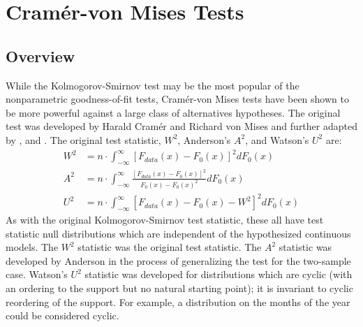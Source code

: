 
\section{Cram\'{e}r-von Mises Tests}

\subsection{Overview}


While the Kolmogorov-Smirnov test may be the most popular of
the nonparametric goodness-of-fit tests, Cram\'{e}r-von Mises
tests have been shown to be more powerful against a large class
of alternatives hypotheses. 
The original test was developed by
Harald Cram\'{e}r and Richard von Mises \citep{cramer1928, vonmises1928} and further adapted by \cite{anderson1952}, and  \cite{Watson1961}. 
The original test statistic, $W^2$, Anderson's $A^2$, and Watson's
$U^2$ are:
\begin{align}
W^2 &= n \cdot \int_{-\infty}^{\infty} \left[ F_{data}(x)- F_{0}(x) \right]^2 dF_0(x) \label{W2} \\
A^2 &= n \cdot \int_{-\infty}^{\infty} \frac{\left[F_{data}(x)- F_{0}(x) \right]^2}{F_0(x) -F_0(x)^2} dF_0(x) \label{A2} \\
U^2 &= n \cdot \int_{-\infty}^{\infty} \left[ F_{data}(x)- F_{0}(x) - W^2 \right]^2 dF_0(x) \label{U2}
\end{align}
As with the original Kolmogorov-Smirnov test statistic, these all have 
test statistic null distributions which are independent of the
hypothesized continuous models.
The $W^2$ statistic was the original test statistic.
The $A^2$ statistic was developed by
Anderson in the process of generalizing the test for the two-sample case.
Watson's $U^2$ statistic was developed for distributions
which are cyclic (with an ordering to the support but
no natural starting point); it is invariant to cyclic reordering of
the support.   For example, a distribution on the months of the year
could be considered cyclic.


